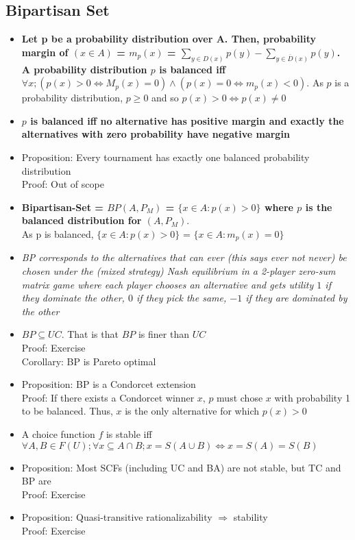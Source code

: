 \documentclass[20pt,a4paper,landscape]{extarticle}
\begin{document}
\begin{flushleft}
\subsection{Bipartisan Set}
\begin{itemize}
\item \textbf{Let p be a probability distribution over A. Then, probability margin of $(x \in A)$ = $m_p(x)$ = $\sum_{y \in D(x)} p(y) - \sum_{y \in \overline{D}(x)} p(y)$.\\
A probability distribution $p$ is balanced iff $\forall x; (p(x) > 0 \Leftrightarrow M_p(x) = 0) \land (p(x) = 0 \Leftrightarrow m_p(x) < 0)$}. As $p$ is a probability distribution, $p \geq 0$ and so $p(x) > 0 \Leftrightarrow p(x) \neq 0$
\item \textbf{$p$ is balanced iff no alternative has positive margin and exactly the alternatives with zero probability have negative margin}
\item Proposition: Every tournament has exactly one balanced probability distribution\\
Proof: Out of scope
\item \textbf{Bipartisan-Set = $BP(A, P_M)$ = $\{x \in A: p(x) > 0\}$ where $p$ is the balanced distribution for $(A, P_M)$}.\\
As p is balanced, $\{x \in A: p(x) > 0\}$ = $\{x \in A: m_p(x) = 0\}$
\item \textit{BP corresponds to the alternatives that can ever (this says ever not never) be chosen under the (mixed strategy) Nash equilibrium in a 2-player zero-sum matrix game where each player chooses an alternative and gets utility $1$ if they dominate the other, $0$ if they pick the same, $-1$ if they are dominated by the other}
\clearpage
\item $BP \subseteq UC$. That is that $BP$ is finer than $UC$\\
Proof: Exercise\\
Corollary: BP is Pareto optimal
\item Proposition: BP is a Condorcet extension\\
Proof: If there exists a Condorcet winner $x$, $p$ must chose $x$ with probability 1 to be balanced. Thus, $x$ is the only alternative for which $p(x) > 0$
\item A choice function $f$ is stable iff $\forall A, B \in F(U); \forall x \subseteq A \cap B; x = S(A \cup B) \Leftrightarrow x = S(A) = S(B)$
\item Proposition: Most SCFs (including UC and BA) are not stable, but TC and BP are\\
Proof: Exercise
\item Proposition: Quasi-transitive rationalizability $\Rightarrow$ stability\\
Proof: Exercise
\end{itemize}
\clearpage

\end{flushleft}
\end{document}
